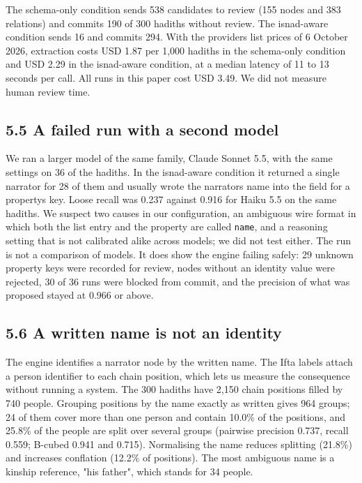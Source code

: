 \documentclass[
  english,
]{article}
\begin{document}
The schema-only condition sends 538 candidates to review (155 nodes and
383 relations) and commits 190 of 300 hadiths without review. The
isnad-aware condition sends 16 and commits 294. With the
provider\textquotesingle s list prices of 6 October 2026, extraction
costs USD 1.87 per 1,000 hadiths in the schema-only condition and USD
2.29 in the isnad-aware condition, at a median latency of 11 to 13
seconds per call. All runs in this paper cost USD 3.49. We did not
measure human review time.

\subsection{5.5 A failed run with a second
model}\label{a-failed-run-with-a-second-model}

We ran a larger model of the same family, Claude Sonnet 5.5, with the
same settings on 36 of the hadiths. In the isnad-aware condition it
returned a single narrator for 28 of them and usually wrote the
narrator\textquotesingle s name into the field for a
property\textquotesingle s key. Loose recall was 0.237 against 0.916 for
Haiku 5.5 on the same hadiths. We suspect two causes in our
configuration, an ambiguous wire format in which both the list entry and
the property are called \texttt{name}, and a reasoning setting that is
not calibrated alike across models; we did not test either. The run is
not a comparison of models. It does show the engine failing safely: 29
unknown property keys were recorded for review, nodes without an
identity value were rejected, 30 of 36 runs were blocked from commit,
and the precision of what was proposed stayed at 0.966 or above.

\subsection{5.6 A written name is not an
identity}\label{a-written-name-is-not-an-identity}

The engine identifies a narrator node by the written name. The Ifta
labels attach a person identifier to each chain position, which lets us
measure the consequence without running a system. The 300 hadiths have
2,150 chain positions filled by 740 people. Grouping positions by the
name exactly as written gives 964 groups; 24 of them cover more than one
person and contain 10.0\% of the positions, and 25.8\% of the people are
split over several groups (pairwise precision 0.737, recall 0.559;
B-cubed 0.941 and 0.715). Normalising the name reduces splitting
(21.8\%) and increases conflation (12.2\% of positions). The most
ambiguous name is a kinship reference, "his father", which stands for 34
people.
\end{document}
